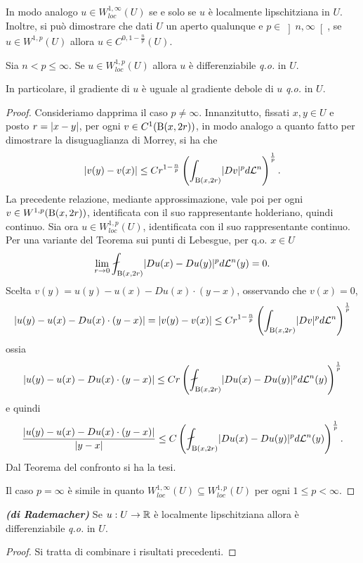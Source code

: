 \begin{osservazione}
	In modo analogo $u \in W^{1,\infty}_{loc}(U)$ se e solo se $u$ è localmente lipschitziana in $U$. Inoltre, si può dimostrare che dati $U$ un aperto qualunque e $p \in \left] n,\infty\right[ $, se $u \in W^{1,p}(U)$ allora $u \in C^{0,1-\frac{n}{p}}(U)$.
\end{osservazione}
\begin{teorema}
	Sia $n < p \le \infty.$ Se $u \in W^{1,p}_{loc}(U)$ allora $u$ è differenziabile \emph{q.o.} in $U$. 
	
	In particolare, il gradiente di $u$ è uguale al gradiente debole di $u$ \emph{q.o.} in $U$.
	\begin{proof} Consideriamo dapprima il caso $p\ne \infty.$ Innanzitutto, fissati $x,y \in U$ e posto $r=\lvert x-y\rvert$, per ogni $v \in C^1(\textup{B}(x,2r))$, in modo analogo a quanto fatto per dimostrare la disuguaglianza di Morrey, si ha che
		\[ \lvert v(y)-v(x)\rvert \le C r^{1-\frac{n}{p}}\left( \int_{\textup{B}(x,2r)}\lvert Dv\rvert^pd\mathcal{L}^n\right) ^{\frac{1}{p}}.\]
		La precedente relazione, mediante approssimazione, vale poi per ogni $v \in W^{1,p}(\textup{B}(x,2r))$, identificata con il suo rappresentante holderiano, quindi continuo. Sia ora $u \in W^{1,p}_{loc}(U)$, identificata con il suo rappresentante continuo. Per una variante del Teorema sui punti di Lebesgue, per q.o. $x \in U$
		\[ \lim\limits_{r \to 0} \fint_{\textup{B}(x,2r)} \abs{Du(x)-Du(y)}^pd\mathcal{L}^n(y) = 0. \]
		Scelta $v(y) = u(y)-u(x)-Du(x)\cdot(y-x)$, osservando che $v(x) = 0$,
		\[ \lvert u(y)-u(x)-Du(x)\cdot(y-x)\rvert = \lvert v(y)-v(x)\rvert \le Cr^{1-\frac{n}{p}}\left( \int_{\textup{B}(x,2r)}\lvert Dv\rvert^pd\mathcal{L}^n\right) ^{\frac{1}{p}}  \]
		ossia 
		\[ \abs{u(y)-u(x)-Du(x)\cdot(y-x)} \le C r\left( \fint_{\textup{B}(x,2r)} \abs{Du(x)-Du(y)}^pd\mathcal{L}^n(y)\right)^{\frac{1}{p}} \]
		e quindi
		\[ \dfrac{\abs{u(y)-u(x)-Du(x)\cdot(y-x)}}{\abs{y-x}} \le C \left( \fint_{\textup{B}(x,2r)} \abs{Du(x)-Du(y)}^pd\mathcal{L}^n(y)\right)^{\frac{1}{p}}. \]
		Dal Teorema del confronto si ha la tesi. 
		
		Il caso $p=\infty$ è simile in quanto $W^{1,\infty}_{loc}(U) \subseteq W^{1,p}_{loc}(U)$ per ogni $1\le p<\infty$.
	\end{proof}
\end{teorema}
\begin{teorema}\emph{\textbf{(di Rademacher)}}
	Se $u:U\to \mathbb{R}$ è localmente lipschitziana allora è differenziabile \emph{q.o.} in $U$. 
	\begin{proof}
		Si tratta di combinare i risultati precedenti.
	\end{proof}
\end{teorema}
